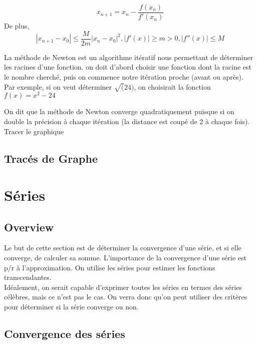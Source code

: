 \documentclass{article}
\begin{document}
\begin{theorem}
    $$ x_{n+1} = x_n - \frac{f(x_n)}{f'(x_n)} $$
    De plus,
    $$ | x_{n+1} - x_0 | \leq \frac{M}{2m} |x_n - x_0| ^2,
    |f'(x)| \geq m > 0, |f''(x)| \leq M$$
\end{theorem}

\begin{remark}
    La méthode de Newton est un algorithme itératif nous permettant
    de déterminer les racines d'une fonction. on doit d'abord choisir
    une fonction dont la racine est le nombre cherché, puis on commence
    notre itération proche (avant ou après). Par exemple, si on veut
    déterminer $\sqrt(24)$, on choisirait la fonction $ f(x) = x^2 - 24$
\end{remark}

\begin{remark}
    On dit que la méthode de Newton converge quadratiquement puisque
    si on double la précision à chaque itération (la distance est coupé
    de 2 à chaque fois). Tracer le graphique
\end{remark}

\subsection{Tracés de Graphe}

\pagebreak

\section{Séries}

\subsection{Overview}

Le but de cette section est de déterminer la convergence d'une
série, et si elle converge, de calculer sa somme. L'importance de
la convergence d'une série est p/r à l'approximation. On utilise
les séries pour estimer les fonctions transcendantes.\\

Idéalement, on serait capable d'exprimer toutes les séries en
termes des séries célèbres, mais ce n'est pas le cas. On verra donc
qu'on peut utiliser des critères pour déterminer si la série converge
ou non.

\subsection{Convergence des séries}
\end{document}
